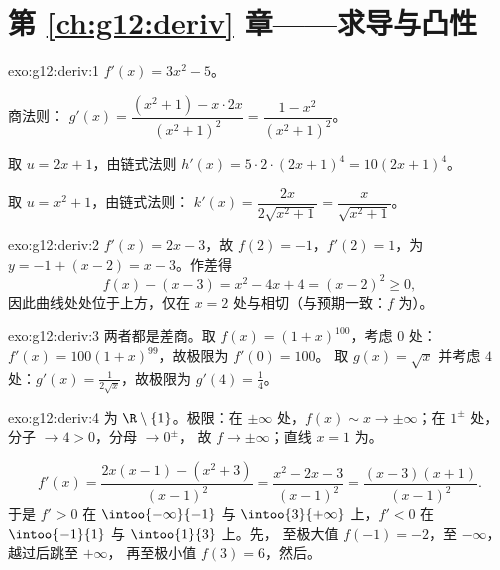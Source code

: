 \section*{第 \ref{ch:g12:deriv} 章——求导与凸性}

\begin{solution}{exo:g12:deriv:1}
$f'(x) = 3x^2 - 5$。

商法则：
$g'(x) = \dfrac{(x^2+1) - x\cdot 2x}{(x^2+1)^2} = \dfrac{1 - x^2}{(x^2+1)^2}$。

取 $u = 2x+1$，由链式法则 $h'(x) = 5 \cdot 2 \cdot (2x+1)^4 = 10(2x+1)^4$。

取 $u = x^2 + 1$，由链式法则：
$k'(x) = \dfrac{2x}{2\sqrt{x^2+1}} = \dfrac{x}{\sqrt{x^2+1}}$。
\end{solution}

\begin{solution}{exo:g12:deriv:2}
$f'(x) = 2x - 3$，故 $f(2) = -1$，$f'(2) = 1$，为
$y = -1 + (x - 2) = x - 3$。作差得
\[
f(x) - (x - 3) = x^2 - 4x + 4 = (x-2)^2 \geq 0 ,
\]
因此曲线处处位于上方，仅在 $x = 2$
处与相切（与预期一致：$f$ 为）。
\end{solution}

\begin{solution}{exo:g12:deriv:3}
两者都是差商。取 $f(x) = (1+x)^{100}$，考虑 $0$ 处：
$f'(x) = 100(1+x)^{99}$，故极限为 $f'(0) = 100$。
取 $g(x) = \sqrt{x}$ 并考虑 $4$ 处：$g'(x) = \frac{1}{2\sqrt{x}}$，故极限为
$g'(4) = \frac14$。
\end{solution}

\begin{solution}{exo:g12:deriv:4}
为 $\R \setminus \{1\}$。极限：在 $\pm\infty$ 处，$f(x) \sim x \to
\pm\infty$；在 $1^\pm$ 处，分子 $\to 4 > 0$，分母 $\to 0^\pm$，
故 $f \to \pm\infty$；直线 $x = 1$ 为。

\[
f'(x) = \frac{2x(x-1) - (x^2+3)}{(x-1)^2} = \frac{x^2 - 2x - 3}{(x-1)^2}
= \frac{(x-3)(x+1)}{(x-1)^2}.
\]
于是 $f' > 0$ 在 $\intoo{-\infty}{-1}$ 与 $\intoo{3}{+\infty}$ 上，$f' < 0$ 在
$\intoo{-1}{1}$ 与 $\intoo{1}{3}$ 上。先，
至极大值 $f(-1) = -2$，至 $-\infty$，越过后跳至 $+\infty$，
再至极小值 $f(3) = 6$，然后。
\end{solution}

